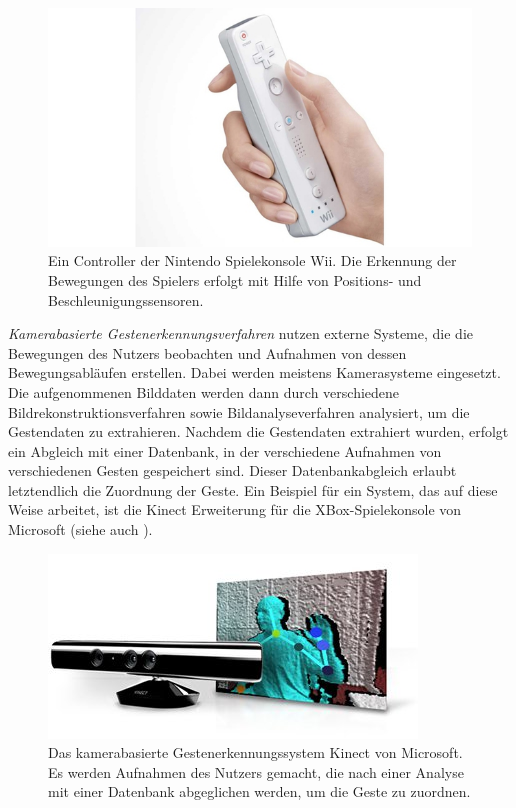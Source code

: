 \begin{figure}[h]
	\centering
	\includegraphics[scale=0.5]{../figures/WiiController.jpg}
	\caption{Ein Controller der Nintendo Spielekonsole Wii. Die Erkennung der Bewegungen des Spielers erfolgt mit Hilfe von Positions- und Beschleunigungssensoren. }
	\label{fig:WiiController}
\end{figure}
\textit{Kamerabasierte Gestenerkennungsverfahren} nutzen externe Systeme, die die Bewegungen des Nutzers beobachten und Aufnahmen von dessen Bewegungsabläufen erstellen. Dabei werden meistens Kamerasysteme eingesetzt. Die aufgenommenen Bilddaten werden dann durch verschiedene Bildrekonstruktionsverfahren sowie Bildanalyseverfahren analysiert, um die Gestendaten zu extrahieren. Nachdem die Gestendaten extrahiert wurden, erfolgt ein Abgleich mit einer Datenbank, in der verschiedene Aufnahmen von verschiedenen Gesten gespeichert sind. Dieser Datenbankabgleich erlaubt letztendlich die Zuordnung der Geste. Ein Beispiel für ein System, das auf diese Weise arbeitet, ist die Kinect Erweiterung für die XBox-Spielekonsole von Microsoft (siehe auch ).
\begin{figure}[h]
	\centering
	\includegraphics[scale=0.5]{../figures/MSKinect.jpg}
	\caption{Das kamerabasierte Gestenerkennungssystem Kinect von Microsoft. Es werden Aufnahmen des Nutzers gemacht, die nach einer Analyse mit einer Datenbank abgeglichen werden, um die Geste zu zuordnen. }
	\label{fig:MSKinect}
\end{figure}
